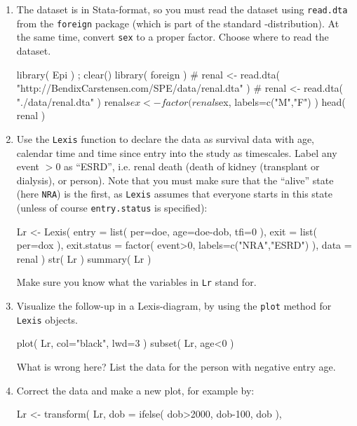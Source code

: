 \begin{enumerate}
\item The dataset is in Stata-format, so you must read the dataset
  using \texttt{read.dta} from the \texttt{foreign} package (which is
  part of the standard \R-distribution). At the same time, convert
  \texttt{sex} to a proper factor. Choose where to read the dataset.
\begin{Schunk}
\begin{Sinput}
 library( Epi ) ; clear()
 library( foreign )
 # renal <- read.dta( "http://BendixCarstensen.com/SPE/data/renal.dta" )
 # renal <- read.dta( "./data/renal.dta" )
 renal$sex <- factor( renal$sex, labels=c("M","F") )
 head( renal )
\end{Sinput}
\end{Schunk}
\item Use the \texttt{Lexis} function to declare the data as
  survival data with age, calendar time and time since entry into
  the study as timescales. Label any event $>0$ as ``ESRD'',
  i.e. renal death (death of kidney (transplant or dialysis), or
  person).
  Note that you must make sure that the ``alive'' state (here
  \texttt{NRA}) is the first, as \texttt{Lexis} assumes that
  everyone starts in this state (unless of course
  \texttt{entry.status} is specified):
\begin{Schunk}
\begin{Sinput}
 Lr <- Lexis( entry = list( per=doe,
                            age=doe-dob,
                            tfi=0 ),
               exit = list( per=dox ),
        exit.status = factor( event>0, labels=c("NRA","ESRD") ),
               data = renal )
 str( Lr )
 summary( Lr )
\end{Sinput}
\end{Schunk}
Make sure you know what the variables in \texttt{Lr} stand for.
\item Visualize the follow-up in a Lexis-diagram, by using the
  \texttt{plot} method for \texttt{Lexis} objects.
\begin{Schunk}
\begin{Sinput}
 plot( Lr, col="black", lwd=3 )
 subset( Lr, age<0 )
\end{Sinput}
\end{Schunk}
What is wrong here? List the data for the person with negative entry age.
\item Correct the data and make a new plot, for example by:
\begin{Schunk}
\begin{Sinput}
 Lr <- transform( Lr, dob = ifelse( dob>2000, dob-100, dob ),

\end{Sinput}
\end{Schunk}
\end{enumerate}
